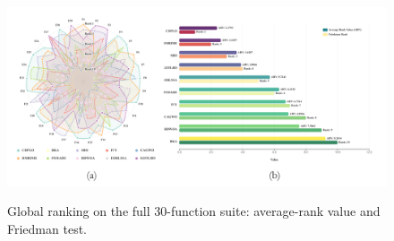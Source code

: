 \documentclass[3p]{elsarticle}
\begin{document}
\begin{figure}
\caption{Global ranking on the full 30-function suite:
average-rank value and Friedman test.}
\includegraphics[width=\linewidth]{Cmp-FR}
\label{fig: Cmp-FR}
\end{figure}

\begin{table}
\centering
\begin{tabular}{@{} lcccccccccccccccc @{}}
\end{tabular}
\end{table}


\end{document}
